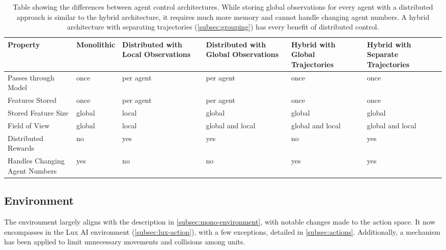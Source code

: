\begin{table}[htbp]
    \centering
    \begin{tabularx}{\linewidth}{|Y|C{2.3cm}|C{2.3cm}|C{2.3cm}|C{2.3cm}|C{2.3cm}|}
        \toprule
        \textbf{Property} & \textbf{Monolithic} & \textbf{Distributed with Local Observations} & \textbf{Distributed with Global Observations} & \textbf{Hybrid with Global Trajectories} & \textbf{Hybrid with Separate Trajectories} \\
        \midrule
        Passes through Model & once & per agent & per agent & once & once \\
        \midrule
        Features Stored & once & per agent & per agent & once & once \\
        \midrule
        Stored Feature Size & global & local & global & global & global \\
        \midrule
        Field of View & global & local & global and local & global and local & global and local \\
        \midrule
        Distributed Rewards & no & yes & yes & no & yes \\
        \midrule
        Handles Changing Agent Numbers & yes & no & no & yes & yes \\
        \bottomrule
    \end{tabularx}
    \captionsetup{justification=justified, singlelinecheck=false, width=1\linewidth, labelfont=bf} 
    \caption{Table showing the differences between agent control architectures. While storing global observations for every agent with a distributed approach is similar to the hybrid architecture, it requires much more memory and cannot handle changing agent numbers. A hybrid architecture with separating trajectories (\autoref{subsec:grouping}) has every benefit of distributed control.}
    \label{tab:hybrid-table}
\end{table}

\subsection{Environment}

\noindent The environment largely aligns with the description in \autoref{subsec:mono-environment}, with notable changes made to the action space. It now encompasses  in the Lux AI environment (\autoref{subsec:lux-action}), with a few exceptions, detailed in \autoref{subsec:actions}. Additionally, a  mechanism has been applied to limit unnecessary movements and collisions among units.

